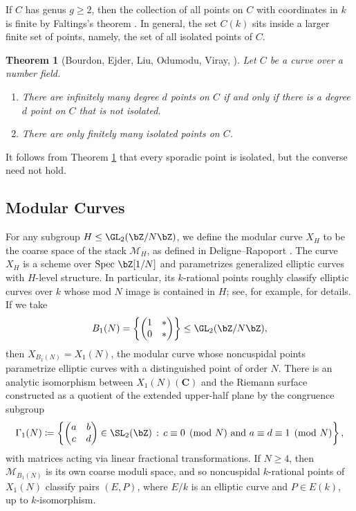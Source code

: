 \documentclass[11pt,reqno]{amsart}
\theoremstyle{plain}
\newtheorem{theorem}{Theorem}%
\theoremstyle{definition}
\newcommand{\Z}{\bZ}
\newcommand{\abbey}[1]{\textcolor{blue}{Abbey: #1}}
\begin{document}
If $C$ has genus $g\geq 2$, then the collection of all points on $C$ with coordinates in $k$ is finite by Faltings's theorem \cite{faltings83}. In general, the set $C(k)$ sits inside a larger finite set of points, namely, the set of all isolated points of $C$.
    \begin{theorem}[{Bourdon, Ejder, Liu, Odumodu, Viray, \cite[Theorem 4.2]{BELOV}}]\label{thm:FiniteIsolated}
        Let $C$ be a curve over a number field.
        \begin{enumerate}
            \item There are infinitely many degree $d$ points on $C$ if and only if there is a degree $d$ point on $C$ that is \emph{not} isolated.
            \item There are only finitely many isolated points on $C$.
        \end{enumerate}
    \end{theorem}
It follows from Theorem \ref{thm:FiniteIsolated} that every sporadic point is isolated, but the converse need not hold.

\subsection{Modular Curves}
For any subgroup $H \leq \GL_2(\Z/N\Z)$, we define the modular curve $X_H$ to be the coarse space of the stack $\mathcal{M}_H$, as defined in Deligne--Rapoport \cite{DR}. The curve $X_H$ is a scheme over $\text{Spec }\Z[1/N]$ and parametrizes generalized elliptic curves with $H$-level structure. In particular, its $k$-rational points roughly classify elliptic curves over $k$ whose mod $N$ image is contained in $H$; see, for example, \cite[$\S2.3$]{RSZB2022} for details. If we take
\[
B_1(N) =\left\{ \begin{pmatrix}
1 & * \\
0 & *
\end{pmatrix} \right \} \leq \GL_2(\Z/N\Z),
\]
then $X_{B_1(N)}=X_1(N)$, the modular curve whose noncuspidal points parametrize elliptic curves with a distinguished point of order $N$. There is an analytic isomorphism between $X_1(N)(\mathbf{C})$ and the Riemann surface constructed as a quotient of the extended upper-half plane by the congruence subgroup
\[
\Gamma_1(N) \coloneqq\left\{ \begin{pmatrix}
a & b \\
c & d
\end{pmatrix} \in \SL_2(\Z) \, : \, c \equiv 0 \pmod{N} \text{ and } a \equiv d \equiv 1 \pmod{N} \right \},
\]
with matrices acting via linear fractional transformations. If $N \geq 4$, then $\mathcal{M}_{B_1(N)}$ is its own coarse moduli space, and so noncuspidal $k$-rational points of $X_1(N)$ classify pairs $(E,P)$, where $E/k$ is an elliptic curve and $P\in E(k)$, up to $k$-isomorphism.
\end{document}
